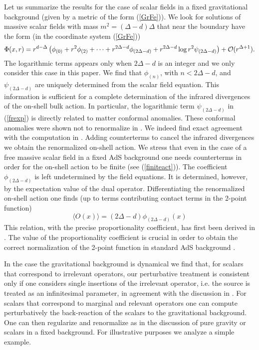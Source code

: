 \documentclass{article}
\def\F{{\cal F}}
\def\co{{\rm Com}}
\def\be{\begin{equation}}       \def\eq{\begin{equation}}
\def\ee{\end{equation}}         \def\eqe{\end{equation}}
\def\f{\phi}               %
\def\D{\Delta}
\def\F{\Phi}
\def\co{{\cal O}}
\def\>{\rangle} %
\def\<{\langle} %
\begin{document}
Let us summarize the results for the case of scalar fields
in a fixed gravitational background (given by a 
metric of the form (\ref{GrFe})). We look for 
solutions of massive scalar fields with mass
$m^2=(\D-d) \D$
that near the boundary have the form (in the coordinate system (\ref{GrFe}))
\be \label{frexp}
\F(x,r)=r^{d-\D}\left(\f_{(0)} + r^2 \f_{(2)} + \cdots +
r^{2\D-d} \f_{(2\D-d)} + r^{2\D-d} \log r^2 \psi_{(2\D-d)}\right)
+\co(r^{\D+1}).
\ee
The logarithmic terms appears only when $2\D-d$ is an integer
and we only consider this case in this paper.
We find that $\f_{(n)}$, with $n<2\D-d$, and $\psi_{(2\D-d)}$
are uniquely determined from the scalar field equation.
This information is sufficient for a complete 
determination of the infrared divergences of the 
on-shell bulk action. In particular, 
the logarithmic term $\psi_{(2\D-d)}$ in (\ref{frexp})
is directly related to matter conformal anomalies.
These conformal anomalies were shown not to renormalize
in \cite{PeSk}. We indeed find exact agreement with the computation 
in \cite{PeSk}. Adding counterterms to cancel 
the infrared divergences we obtain the renormalized on-shell
action. We stress that even in the case of a free 
massive scalar field in a fixed AdS background 
one needs counterterms in order for the on-shell action
to be finite (see (\ref{finiteact})).
The coefficient $\f_{(2\D-d)}$ is left undetermined
by the field equations. It is determined, however, by the 
expectation value of the dual operator. Differentiating the 
renormalized on-shell action one finds (up to terms 
contributing contact terms in the 2-point function)
\be
\< O (x)\> = (2 \D- d) \f_{(2\D-d)}(x)
\ee
This relation, with the precise proportionality coefficient,
has first been derived in \cite{KleWit}. The value of the proportionality 
coefficient is crucial in order to obtain the correct 
normalization  of the 2-point function in standard
AdS background \cite{FMMR}.

In the case the gravitational background is dynamical we find that, 
for scalars that correspond to irrelevant operators, our
perturbative treatment is consistent only if one considers
single insertions of the irrelevant operator, i.e. the source
is treated as an infinitesimal parameter, in agreement with the discussion 
in \cite{Wit}. For scalars that correspond to marginal and
relevant operators one can compute perturbatively the back-reaction
of the scalars to the gravitational background. One can then 
regularize and renormalize as in the discussion of pure 
gravity or scalars in a fixed background. For illustrative
purposes we analyze a simple example.
\end{document}
